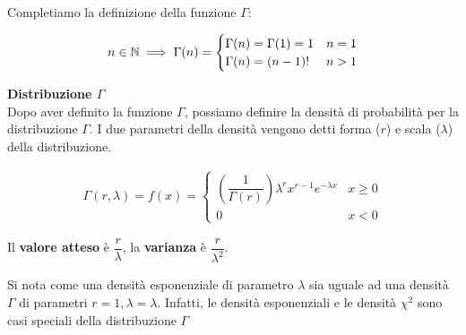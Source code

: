 \begin{defn}
    Completiamo la definizione della funzione $\Gamma$:

    \begin{equation*}
        \begin{aligned}
            n \in \mathbb{N} \implies \Gamma(n) = \begin{cases}
                \Gamma(n) = \Gamma(1) = 1 & n = 1 \\
                \Gamma(n) = (n-1)! & n > 1
            \end{cases}
        \end{aligned}
    \end{equation*}
\end{defn}

\begin{defn}
    \textbf{Distribuzione $\Gamma$} \\
    Dopo aver definito la funzione $\Gamma$, possiamo definire la densità di
    probabilità per la distribuzione $\Gamma$. I due parametri della densità
    vengono detti forma ($r$) e scala ($\lambda$) della distribuzione.

    \begin{equation*}
        \begin{aligned}
            \Gamma(r, \lambda) = f(x) = \begin{cases}
                \left( \dfrac{1}{\Gamma(r)} \right) \lambda^r  x^{r-1} e^{-\lambda x} & x \geq 0 \\
                0 & x < 0
            \end{cases}
        \end{aligned}
    \end{equation*}

    Il \textbf{valore atteso} è $\dfrac{r}{\lambda}$, la \textbf{varianza} è $\dfrac{r}{\lambda^2}$.

    Si nota come una densità esponenziale di parametro $\lambda$ sia uguale ad
    una densità $\Gamma$ di parametri $r = 1, \lambda = \lambda$. Infatti, le
    densità esponenziali e le densità $\chi^2$ sono casi speciali della
    distribuzione $\Gamma$

    \begin{figure}[htbp!]
        \centering


\end{figure}
\end{defn}
